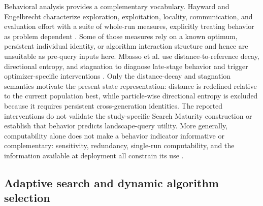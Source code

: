 Behavioral analysis provides a complementary vocabulary.  Hayward and
Engelbrecht characterize exploration, exploitation, locality, communication,
and evaluation effort with a suite of whole-run measures, explicitly treating
behavior as problem dependent \cite{haywardDeterminingMetaheuristicSimilarity2025}.
Some of those measures rely on a known optimum, persistent individual identity,
or algorithm interaction structure and hence are unsuitable as pre-query inputs
here.  Mbasso et al. use distance-to-reference decay, directional entropy, and
stagnation to diagnose late-stage behavior and trigger optimizer-specific
interventions \cite{mbassoHowMetaheuristicsExploit2026}.  Only the distance-decay
and stagnation semantics motivate the present state representation: distance is
redefined relative to the current population best, while particle-wise
directional entropy is excluded because it requires persistent cross-generation
identities.  The reported interventions do not validate the study-specific
Search Maturity construction or establish that behavior predicts landscape-query
utility.  More generally, computability alone does not
make a behavior indicator informative or complementary: sensitivity,
redundancy, single-run computability, and the information available at
deployment all constrain its use
\cite{haywardSurveyAnalysisMetaheuristic2026}.

\subsection{Adaptive search and dynamic algorithm selection}

